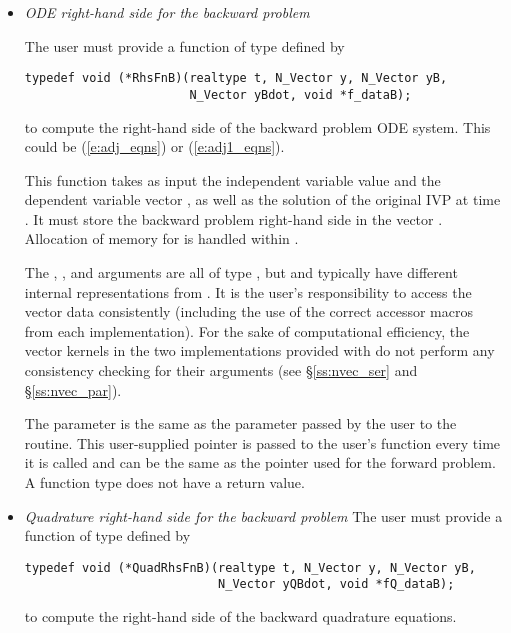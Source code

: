 \begin{itemize}

\item{\em ODE right-hand side for the backward problem}

  The user must provide a function of type  defined by
\begin{verbatim}
typedef void (*RhsFnB)(realtype t, N_Vector y, N_Vector yB, 
                       N_Vector yBdot, void *f_dataB);
\end{verbatim}
  to compute the right-hand side of the backward problem ODE system.
  This could be (\ref{e:adj_eqns}) or (\ref{e:adj1_eqns}).

  This function takes as input the 
  independent variable value  and the dependent variable vector ,
  as well as the solution of the original IVP  at time .  
  It must store the backward problem right-hand side in the vector .  
  Allocation of memory for  is handled within {\cvodes}.
  
  The , , and  arguments are all of type ,
  but  and   typically have different internal representations
  from . It is the user's 
  responsibility to access the vector data consistently (including the use of the 
  correct accessor macros from each {\nvector} implementation). For the sake of 
  computational efficiency, the vector kernels in the two {\nvector} implementations 
  provided with {\cvodes} do not perform any consistency checking for their 
   arguments (see \S\ref{ss:nvec_ser} and \S\ref{ss:nvec_par}).

  The  parameter is the same as the  parameter passed by 
  the user to the  routine. This user-supplied pointer is passed to 
  the user's  function every time it is called and can be the same as the 
   pointer used for the forward problem.
  A  function type does not have a return value.

\item{\em Quadrature right-hand side for the backward problem}
  The user must provide a function of type  defined by
\begin{verbatim}
typedef void (*QuadRhsFnB)(realtype t, N_Vector y, N_Vector yB, 
                           N_Vector yQBdot, void *fQ_dataB);
\end{verbatim}
  to compute the right-hand side of the backward quadrature equations.


\end{itemize}
